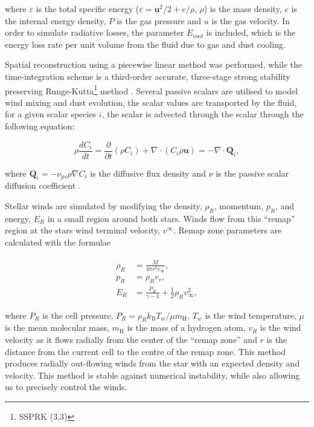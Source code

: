 \documentclass[fleqn,usenatbib]{mnras}
\begin{document}
\noindent
where $\varepsilon$ is the total specific energy ($\varepsilon = \boldsymbol{u}^2/2 + e/\rho $, $\rho$) is the mass density, $e$ is the internal energy density, $P$ is the gas pressure and $u$ is the gas velocity.
In order to simulate radiative losses, the parameter $\dot E_\text{cool}$ is included, which is the energy loss rate per unit volume from the fluid due to gas and dust cooling.

Spatial reconstruction using a piecewise linear method was performed, while the time-integration scheme is a third-order accurate, three-stage strong stability preserving Runge-Kutta\footnote{SSPRK (3,3)} method \citep{gottliebHighOrderStrong2009}.
Several passive scalars are utilised to model wind mixing and dust evolution, the scalar values are transported by the fluid, for a given scalar species $i$, the scalar is advected through the scalar through the following equation:

\begin{equation}
  \rho \frac{dC_i}{dt} = \frac{\partial}{\partial t} \left( \rho C_i \right) + \nabla \cdot \left( C_i \rho \mathbf{u} \right) = -\nabla \cdot \mathbf{Q}_i ,  
\end{equation}

where $\mathbf{Q}_i = - \nu_{ps} \rho \nabla C_i$ is the diffusive flux density and $\nu$ is the passive scalar diffusion coefficient \citep{stoneAthenaAdaptiveMesh2020}.


Stellar winds are simulated by modifying the density, $\rho_R$, momentum, $p_R$, and energy, $E_R$ in a small region around both stars.
Winds flow from this ``remap'' region at the stars wind terminal velocity, $v^\infty$. Remap zone parameters are calculated with the formulae

\begin{subequations}
  \begin{align}
    \rho_R & = \frac{\dot M}{4 \pi r^2 v_\infty} , \\
    p_R    & = \rho_R v_{r} , \\
    E_R    & = \frac{P_R}{\gamma - 1} + \frac{1}{2} \rho_R v_\infty^2 ,
  \end{align}
\end{subequations}

\noindent
where $P_R$ is the cell pressure, $P_R = \rho_R k_\text{B} T_w / \mu m_\text{H}$, $T_w$ is the wind temperature, $\mu$ is the mean molecular mass, $m_\text{H}$ is the mass of a hydrogen atom, $v_R$ is the wind velocity as it flows radially from the center of the ``remap zone'' and $r$ is the distance from the current cell to the centre of the remap zone.
This method produces radially out-flowing winds from the star with an expected density and velocity.
This method is stable against numerical instability, while also allowing us to precisely control the winds.
\end{document}
